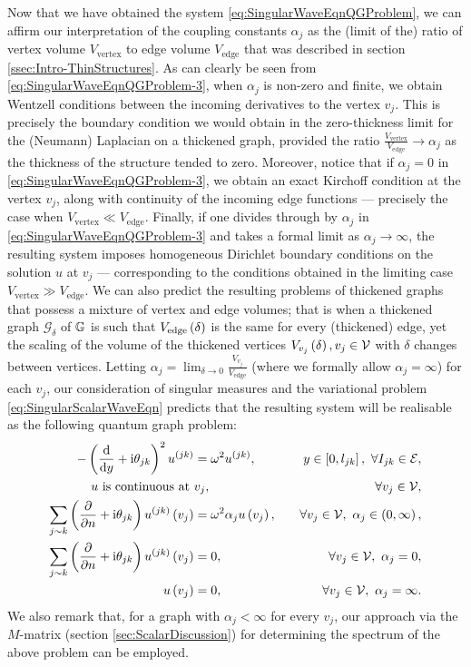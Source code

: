 Now that we have obtained the system \eqref{eq:SingularWaveEqnQGProblem}, we can affirm our interpretation of the coupling constants $\alpha_j$ as the (limit of the) ratio of vertex volume $V_{\mathrm{vertex}}$ to edge volume $V_{\mathrm{edge}}$ that was described in section \ref{ssec:Intro-ThinStructures}.
As can clearly be seen from \eqref{eq:SingularWaveEqnQGProblem-3}, when $\alpha_j$ is non-zero and finite, we obtain Wentzell conditions between the incoming derivatives to the vertex $v_j$.
This is precisely the boundary condition we would obtain in the zero-thickness limit for the (Neumann) Laplacian on a thickened graph, provided the ratio $\frac{V_{\mathrm{vertex}}}{V_{\mathrm{edge}}}\rightarrow\alpha_j$ as the thickness of the structure tended to zero.
Moreover, notice that if $\alpha_j=0$ in \eqref{eq:SingularWaveEqnQGProblem-3}, we obtain an exact Kirchoff condition at the vertex $v_j$, along with continuity of the incoming edge functions --- precisely the case when $V_{\mathrm{vertex}}\ll V_{\mathrm{edge}}$.
Finally, if one divides through by $\alpha_j$ in \eqref{eq:SingularWaveEqnQGProblem-3} and takes a formal limit as $\alpha_j\rightarrow\infty$, the resulting system imposes homogeneous Dirichlet boundary conditions on the solution $u$ at $v_j$ --- corresponding to the conditions obtained in the limiting case $V_{\mathrm{vertex}}\gg V_{\mathrm{edge}}$.
We can also predict the resulting problems of thickened graphs that possess a mixture of vertex and edge volumes; that is when a thickened graph $\mathcal{G}_{\delta}$ of $\mathbb{G}$ is such that $V_{\mathrm{edge}}\left( \delta \right)$ is the same for every (thickened) edge, yet the scaling of the volume of the thickened vertices $V_{v_j}\left( \delta \right), v_j\in\mathcal{V}$ with $\delta$ changes between vertices.
Letting $\alpha_j = \lim_{\delta\rightarrow0}\frac{V_{v_j}}{V_{\mathrm{edge}}}$ (where we formally allow $\alpha_j=\infty$) for each $v_j$, our consideration of singular measures and the variational problem \eqref{eq:SingularScalarWaveEqn} predicts that the resulting system will be realisable as the following quantum graph problem:
\begin{subequations}
	\begin{align*}
		-\bracs{\diff{}{y} + \rmi\qm_{jk}}^2 u^{(jk)} &= \omega^2 u^{(jk)}, \quad & y\in\sqbracs{0,l_{jk}}, \ \forall I_{jk}\in\edgeSet, \\
		u \text{ is continuous at } & v_j, \quad &\forall v_j\in\vertSet, \\
		\sum_{j\con k}\bracs{\pdiff{}{n} + \rmi\qm_{jk}}u^{(jk)}\bracs{v_j} &= \omega^2\alpha_j u\bracs{v_j}, \quad &\forall v_j\in\vertSet, \ \alpha_j\in\bracs{0,\infty}, \\
		\sum_{j\con k}\bracs{\pdiff{}{n} + \rmi\qm_{jk}}u^{(jk)}\bracs{v_j} &= 0, \quad &\forall v_j\in\vertSet, \ \alpha_j = 0, \\
		u\bracs{v_j} &= 0, \quad &\forall v_j\in\vertSet, \ \alpha_j = \infty.
	\end{align*}
\end{subequations}
We also remark that, for a graph with $\alpha_j<\infty$ for every $v_j$, our approach via the $M$-matrix (section \ref{sec:ScalarDiscussion}) for determining the spectrum of the above problem can be employed.

